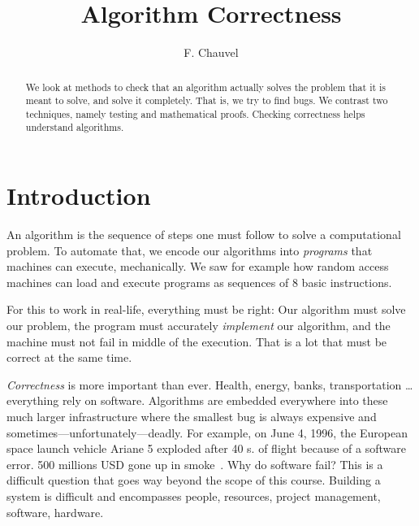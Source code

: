 \documentclass{aldast}
\title{Algorithm Correctness}
\author{F. Chauvel}
\begin{document}
\maketitle

\begin{abstract}
  We look at methods to check that an algorithm actually solves the
  problem that it is meant to solve, and solve it completely. That is,
  we try to find bugs. We contrast two techniques, namely testing and
  mathematical proofs. Checking correctness helps understand
  algorithms.
\end{abstract}

\section*{Introduction}

An algorithm is the sequence of steps one must follow to solve a
computational problem. To automate that, we encode our algorithms into
\emph{programs} that machines can execute, mechanically. We saw for
example how random access machines can load and execute programs as
sequences of 8 basic instructions.

For this to work in real-life, everything must be right: Our algorithm
must solve our problem, the program must accurately \emph{implement}
our algorithm, and the machine must not fail in middle of the
execution. That is a lot that must be correct at the same time.

\emph{Correctness} is more important than ever. Health, energy, banks,
transportation \ldots everything rely on software. Algorithms are
embedded everywhere into these much larger infrastructure where the
smallest bug is always expensive and
sometimes---unfortunately---deadly. For example, on June 4, 1996, the
European space launch vehicle Ariane 5 exploded after 40 s. of flight
because of a software error. 500 millions USD gone up in
smoke~\cite{nuseibeh1997}. Why do software fail? This is a difficult
question that goes way beyond the scope of this course. Building a
system is difficult and encompasses people, resources, project
management, software, hardware.
\end{document}
